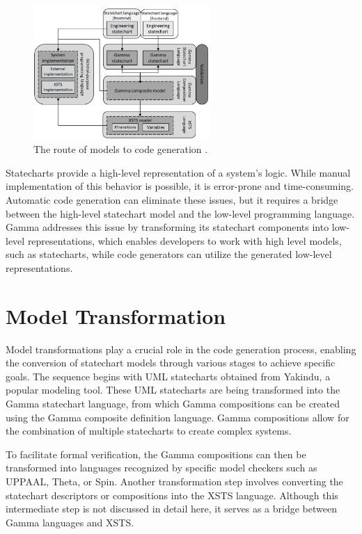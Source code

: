\begin{figure}[h]
	\centering
	\includegraphics[width=0.6\textwidth]{images/gamma.png}
	\caption{The route of models to code generation \cite{CPS}.}
	\label{fig:gamma}
\end{figure}

Statecharts provide a high-level representation of a system's logic. While manual implementation of this behavior is possible, it is error-prone and time-consuming. Automatic code generation can eliminate these issues, but it requires a bridge between the high-level statechart model and the low-level programming language. Gamma addresses this issue by transforming its statechart components into low-level representations, which enables developers to work with high level models, such as statecharts, while code generators can utilize the generated low-level representations.

\section{Model Transformation}

Model transformations play a crucial role in the code generation process, enabling the conversion of statechart models through various stages to achieve specific goals. The sequence begins with UML statecharts obtained from Yakindu, a popular modeling tool. These UML statecharts are being transformed into the Gamma statechart language, from which Gamma compositions can be created using the Gamma composite definition language. Gamma compositions allow for the combination of multiple statecharts to create complex systems.

To facilitate formal verification, the Gamma compositions can then be transformed into languages recognized by specific model checkers such as UPPAAL, Theta, or Spin. Another transformation step involves converting the statechart descriptors or compositions into the XSTS language. Although this intermediate step is not discussed in detail here, it serves as a bridge between Gamma languages and XSTS.

